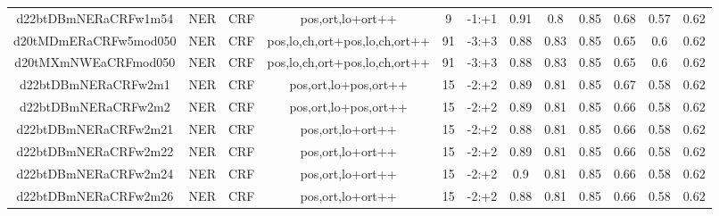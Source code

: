\documentclass[a4paper]{article}
\begin{document}
\begin{landscape}
\begin{center}
\begin{tabular}{ |c|c|c|c|c|c|c|c|c|c|c|c|}
 
 	
 	\small{ d22btDBmNERaCRFw1m54 } & \small{ NER} & \small{  CRF }  & pos,ort,lo+ort++  &  9 &  \small{  -1:+1 }  &  0.91 & 0.8 & 0.85  &  0.68 & 0.57 & 0.62 \\
 	

 
 	
 	\small{ d20tMDmERaCRFw5mod050 } & \small{ NER} & \small{  CRF }  & pos,lo,ch,ort+pos,lo,ch,ort++  &  91 &  \small{  -3:+3 }  &  0.88 & 0.83 & 0.85  &  0.65 & 0.6 & 0.62 \\
 	

 
 	
 	\small{ d20tMXmNWEaCRFmod050 } & \small{ NER} & \small{  CRF }  & pos,lo,ch,ort+pos,lo,ch,ort++  &  91 &  \small{  -3:+3 }  &  0.88 & 0.83 & 0.85  &  0.65 & 0.6 & 0.62 \\
 	

 
 	
 	\small{ d22btDBmNERaCRFw2m1 } & \small{ NER} & \small{  CRF }  & pos,ort,lo+pos,ort++  &  15 &  \small{  -2:+2 }  &  0.89 & 0.81 & 0.85  &  0.67 & 0.58 & 0.62 \\
 	

 
 	
 	\small{ d22btDBmNERaCRFw2m2 } & \small{ NER} & \small{  CRF }  & pos,ort,lo+pos,ort++  &  15 &  \small{  -2:+2 }  &  0.89 & 0.81 & 0.85  &  0.66 & 0.58 & 0.62 \\
 	

 
 	
 	\small{ d22btDBmNERaCRFw2m21 } & \small{ NER} & \small{  CRF }  & pos,ort,lo+ort++  &  15 &  \small{  -2:+2 }  &  0.88 & 0.81 & 0.85  &  0.66 & 0.58 & 0.62 \\
 	

 
 	
 	\small{ d22btDBmNERaCRFw2m22 } & \small{ NER} & \small{  CRF }  & pos,ort,lo+ort++  &  15 &  \small{  -2:+2 }  &  0.89 & 0.81 & 0.85  &  0.66 & 0.58 & 0.62 \\
 	

 
 	
 	\small{ d22btDBmNERaCRFw2m24 } & \small{ NER} & \small{  CRF }  & pos,ort,lo+ort++  &  15 &  \small{  -2:+2 }  &  0.9 & 0.81 & 0.85  &  0.66 & 0.58 & 0.62 \\
 	

 
 	
 	\small{ d22btDBmNERaCRFw2m26 } & \small{ NER} & \small{  CRF }  & pos,ort,lo+ort++  &  15 &  \small{  -2:+2 }  &  0.88 & 0.81 & 0.85  &  0.66 & 0.58 & 0.62 \\
 	


\end{tabular}
\end{center}
\end{landscape}
\end{document}
